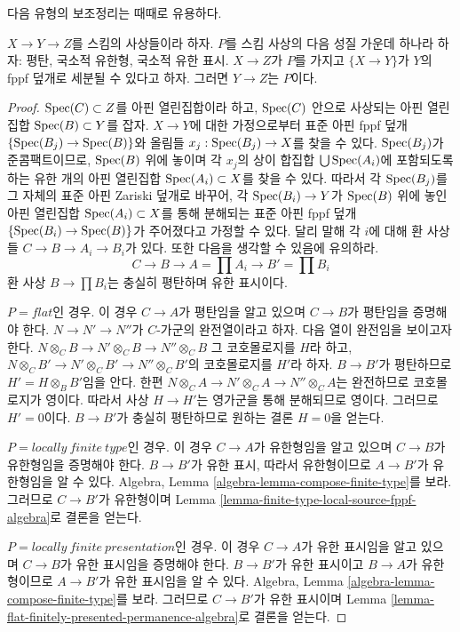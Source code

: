 \noindent
다음 유형의 보조정리는 때때로 유용하다.

\begin{lemma}
\label{lemma-curiosity}
$X \to Y \to Z$를 스킴의 사상들이라 하자. $P$를 스킴 사상의 다음 성질
가운데 하나라 하자: 평탄, 국소적 유한형, 국소적 유한 표시.
$X \to Z$가 $P$를 가지고 $\{X \to Y\}$가 $Y$의 fppf 덮개로 세분될 수
있다고 하자. 그러면 $Y \to Z$는 $P$이다.
\end{lemma}

\begin{proof}
$\mathop{\mathrm{Spec}}(C) \subset Z$를 아핀 열린집합이라 하고, $\mathop{\mathrm{Spec}}(C)$ 안으로 사상되는
아핀 열린집합 $\mathop{\mathrm{Spec}}(B) \subset Y$를 잡자. $X \to Y$에 대한 가정으로부터
표준 아핀 fppf 덮개 $\{\mathop{\mathrm{Spec}}(B_j) \to \mathop{\mathrm{Spec}}(B)\}$와 올림들
$x_j : \mathop{\mathrm{Spec}}(B_j) \to X$를 찾을 수 있다. $\mathop{\mathrm{Spec}}(B_j)$가 준콤팩트이므로,
$\mathop{\mathrm{Spec}}(B)$ 위에 놓이며 각 $x_j$의 상이 합집합
$\bigcup \mathop{\mathrm{Spec}}(A_i)$에 포함되도록 하는 유한 개의 아핀 열린집합
$\mathop{\mathrm{Spec}}(A_i) \subset X$를 찾을 수 있다. 따라서 각 $\mathop{\mathrm{Spec}}(B_j)$를 그 자체의
표준 아핀 Zariski 덮개로 바꾸어, 각 $\mathop{\mathrm{Spec}}(B_i) \to Y$가 $\mathop{\mathrm{Spec}}(B)$ 위에
놓인 아핀 열린집합 $\mathop{\mathrm{Spec}}(A_i) \subset X$를 통해 분해되는 표준 아핀 fppf
덮개 $\{\mathop{\mathrm{Spec}}(B_i) \to \mathop{\mathrm{Spec}}(B)\}$가 주어졌다고 가정할 수 있다. 달리 말해
각 $i$에 대해 환 사상들 $C \to B \to A_i \to B_i$가 있다. 또한 다음을
생각할 수 있음에 유의하라.
$$
C \to B \to A = \prod A_i \to B' = \prod B_i
$$
환 사상 $B \to \prod B_i$는 충실히 평탄하며 유한 표시이다.

\medskip\noindent
$P = flat$인 경우. 이 경우 $C \to A$가 평탄임을 알고 있으며
$C \to B$가 평탄임을 증명해야 한다. $N \to N' \to N''$가 $C$-가군의
완전열이라고 하자. 다음 열이 완전임을 보이고자 한다.
$N \otimes_C B \to N' \otimes_C B \to N'' \otimes_C B$
그 코호몰로지를 $H$라 하고,
$N \otimes_C B' \to N' \otimes_C B' \to N'' \otimes_C B'$의
코호몰로지를 $H'$라 하자. $B \to B'$가 평탄하므로
$H' = H \otimes_B B'$임을 안다. 한편
$N \otimes_C A \to N' \otimes_C A \to N'' \otimes_C A$는 완전하므로
코호몰로지가 영이다. 따라서 사상 $H \to H'$는 영가군을 통해 분해되므로
영이다. 그러므로 $H' = 0$이다. $B \to B'$가 충실히 평탄하므로 원하는
결론 $H = 0$을 얻는다.

\medskip\noindent
$P = locally\ finite\ type$인 경우. 이 경우 $C \to A$가 유한형임을 알고
있으며 $C \to B$가 유한형임을 증명해야 한다. $B \to B'$가 유한 표시,
따라서 유한형이므로 $A \to B'$가 유한형임을 알 수 있다. Algebra, Lemma
\ref{algebra-lemma-compose-finite-type}를 보라. 그러므로 $C \to B'$가
유한형이며 Lemma \ref{lemma-finite-type-local-source-fppf-algebra}로 결론을
얻는다.

\medskip\noindent
$P = locally\ finite\ presentation$인 경우. 이 경우 $C \to A$가 유한
표시임을 알고 있으며 $C \to B$가 유한 표시임을 증명해야 한다.
$B \to B'$가 유한 표시이고 $B \to A$가 유한형이므로 $A \to B'$가 유한
표시임을 알 수 있다. Algebra, Lemma
\ref{algebra-lemma-compose-finite-type}를 보라. 그러므로 $C \to B'$가 유한
표시이며 Lemma \ref{lemma-flat-finitely-presented-permanence-algebra}로
결론을 얻는다.
\end{proof}










